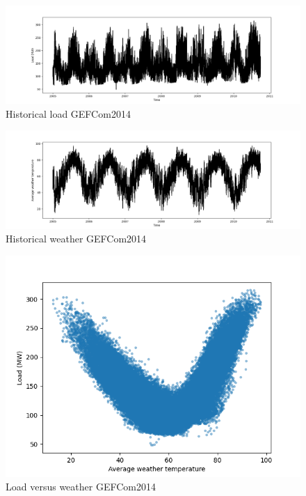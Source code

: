 \begin{figure}[!h]
    \includegraphics[width=\textwidth]{images/gefcom_load_historical.png}
    \caption{Historical load GEFCom2014}
    \label{fig:gefcom_load_historical}
\end{figure}

\begin{figure}[!h]
    \includegraphics[width=\textwidth]{images/gefcom_w_avg_historical.png}
    \caption{Historical weather GEFCom2014}
    \label{fig:gefcom_w_avg_historical}
\end{figure}

\begin{figure}[!h]
    \includegraphics[width=\textwidth]{images/gefcom_load_vs_w_avg.png}
    \caption{Load versus weather GEFCom2014}
    \label{fig:gefcom_load_vs_w_avg}
\end{figure}

